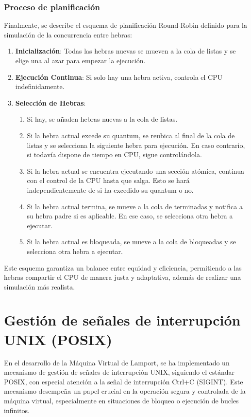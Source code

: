\subsubsection{Proceso de planificación}
Finalmente, se describe el esquema de planificación Round-Robin definido para la simulación de la concurrencia entre hebras:
\begin{enumerate}
    \item \textbf{Inicialización}: Todas las hebras nuevas se mueven a la cola de listas y se elige una al azar para empezar la ejecución.
    \item \textbf{Ejecución Continua}: Si solo hay una hebra activa, controla el CPU indefinidamente.

    \item \textbf{Selección de Hebras}:
    \begin{enumerate}
        \item Si hay, se añaden hebras nuevas a la cola de listas.
        \item Si la hebra actual excede su quantum, se reubica al final de la cola de listas y se selecciona la siguiente hebra para ejecución. En caso contrario, si todavía dispone de tiempo en CPU, sigue controlándola.
        \item Si la hebra actual se encuentra ejecutando una sección atómica, continua con el control de la CPU hasta que salga. Esto se hará independientemente de si ha excedido su quantum o no.
        \item Si la hebra actual termina, se mueve a la cola de terminadas y notifica a su hebra padre si es aplicable. En ese caso, se selecciona otra hebra a ejecutar.
        \item Si la hebra actual es bloqueada, se mueve a la cola de bloqueadas y se selecciona otra hebra a ejecutar.
    \end{enumerate}

\end{enumerate}

Este esquema garantiza un balance entre equidad y eficiencia, permitiendo a las hebras compartir el CPU de manera justa y adaptativa, además de realizar una simulación más realista.

\section{Gestión de señales de interrupción UNIX (POSIX)}\label{sec:posixSignalsLMP}
En el desarrollo de la Máquina Virtual de Lamport, se ha implementado un mecanismo de gestión de señales de interrupción UNIX, siguiendo el estándar POSIX, con especial atención a la señal de interrupción Ctrl+C (SIGINT). Este mecanismo desempeña un papel crucial en la operación segura y controlada de la máquina virtual, especialmente en situaciones de bloqueo o ejecución de bucles infinitos.


